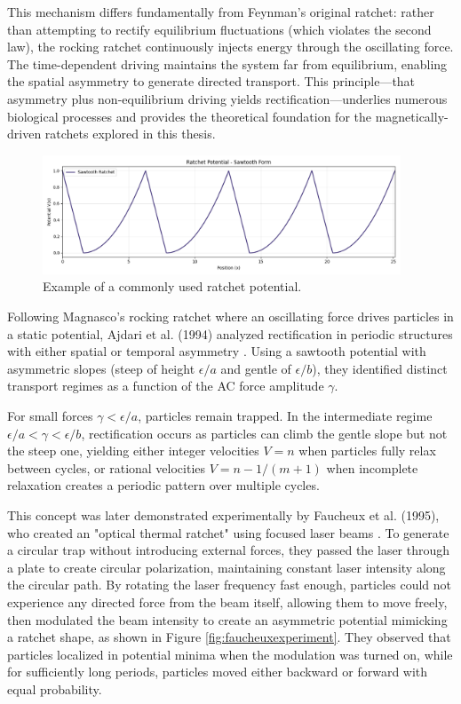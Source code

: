 This mechanism differs fundamentally from Feynman's original ratchet: rather than attempting to rectify equilibrium fluctuations (which violates the second law), the rocking ratchet continuously injects energy through the oscillating force. The time-dependent driving maintains the system far from equilibrium, enabling the spatial asymmetry to generate directed transport. This principle—that asymmetry plus non-equilibrium driving yields rectification—underlies numerous biological processes and provides the theoretical foundation for the magnetically-driven ratchets explored in this thesis.

\begin{figure}[h]
  \begin{center}
    \includegraphics[width=0.95\textwidth]{figures/ratchet_potential.png}
  \end{center}
  \caption[Ratchet potential example.]{Example of a commonly used ratchet potential.}\label{fig:}
\end{figure}


Following Magnasco's rocking ratchet where an oscillating force drives particles in a static potential, Ajdari et al. (1994) analyzed rectification in periodic structures with either spatial or temporal asymmetry \cite{ajdari1994rectified}. Using a sawtooth potential with asymmetric slopes (steep of height $\epsilon/a$ and gentle of $\epsilon/b$), they identified distinct transport regimes as a function of the AC force amplitude $\gamma$. 

For small forces $\gamma < \epsilon/a$, particles remain trapped. In the intermediate regime $\epsilon/a < \gamma < \epsilon/b$, rectification occurs as particles can climb the gentle slope but not the steep one, yielding either integer velocities $V = n$ when particles fully relax between cycles, or rational velocities $V = n - 1/(m+1)$ when incomplete relaxation creates a periodic pattern over multiple cycles.


This concept was later demonstrated experimentally by Faucheux et al. (1995), who created an "optical thermal ratchet" using focused laser beams \cite{faucheux1995optical}. To generate a circular trap without introducing external forces, they passed the laser through a plate to create circular polarization, maintaining constant laser intensity along the circular path. By rotating the laser frequency fast enough, particles could not experience any directed force from the beam itself, allowing them to move freely, then modulated the beam intensity to create an asymmetric potential mimicking a ratchet shape, as shown in Figure \ref{fig:faucheuxexperiment}. They observed that particles localized in potential minima when the modulation was turned on, while for sufficiently long periods, particles moved either backward or forward with equal probability.

